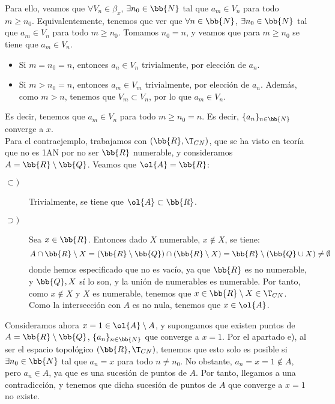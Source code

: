 \begin{ejercicio}
\begin{enumerate}[label=\alph*)]
        Para ello, veamos que $\forall V_n\in \beta_x$, $\exists n_0\in\bb{N}$ tal que $a_m\in V_n$ para todo $m\geq n_0$. Equivalentemente, tenemos que ver que $\forall n\in \bb{N}$, $\exists n_0\in \bb{N}$ tal que $a_m\in V_n$ para todo $m\geq n_0$. Tomamos $n_0=n$, y veamos que para $m\geq n_0$ se tiene que $a_m\in V_n$.
        \begin{itemize}
            \item Si $m=n_0=n$, entonces $a_n\in V_n$ trivialmente, por elección de $a_n$.
            \item Si $m>n_0=n$, entonces $a_m\in V_m$ trivialmente, por elección de $a_n$. Además, como $m>n$, tenemos que $V_m\subset V_n$, por lo que $a_m\in V_n$.
        \end{itemize}
        Es decir, tenemos que $a_m\in V_n$ para todo $m\geq n_0=n$. Es decir, $\{a_n\}_{n\in \bb{N}}$ converge a $x$.\\


        Para el contraejemplo, trabajamos con $(\bb{R},\T_{CN})$, que se ha visto en teoría que no es 1AN por no ser $\bb{R}$ numerable, y consideramos $A=\bb{R}\setminus \bb{Q}$. Veamos que $\ol{A} = \bb{R}$:
        \begin{description}
            \item[$\subset)$] Trivialmente, se tiene que $\ol{A}\subset \bb{R}$.
            \item[$\supset)$] Sea $x\in \bb{R}$. Entonces dado $X$ numerable, $x\notin X$, se tiene:
            \begin{equation*}
                A\cap \bb{R}\setminus X = (\bb{R}\setminus \bb{Q})\cap (\bb{R}\setminus X)
                = \bb{R}\setminus (\bb{Q}\cup X) \neq \emptyset
            \end{equation*}
            donde hemos especificado que no es vacío, ya que $\bb{R}$ es no numerable, y $\bb{Q},X$ sí lo son, y la unión de numerables es numerable. Por tanto, como $x\notin X$ y $X$ es numerable, tenemos que $x\in \bb{R}\setminus X\in \T_{CN}$. Como la intersección con $A$ es no nula, tenemos que $x\in \ol{A}$.
        \end{description}
        
        Consideramos ahora $x=1\in \ol{A}\setminus A$, y supongamos que existen puntos de $A=\bb{R}\setminus \bb{Q}$, $\{a_n\}_{n\in \bb{N}}$ que converge a $x=1$. Por el apartado e), al ser el espacio topológico $(\bb{R},\T_{CN})$, tenemos que esto solo es posible si $\exists n_0\in \bb{N}$ tal que $a_n=x$ para todo $n\neq n_0$. No obstante, $a_n=x=1\notin A$, pero $a_n\in A$, ya que es una sucesión de puntos de $A$. Por tanto, llegamos a una contradicción, y tenemos que dicha sucesión de puntos de $A$ que converge a $x=1$ no existe.


\end{enumerate}
\end{ejercicio}
